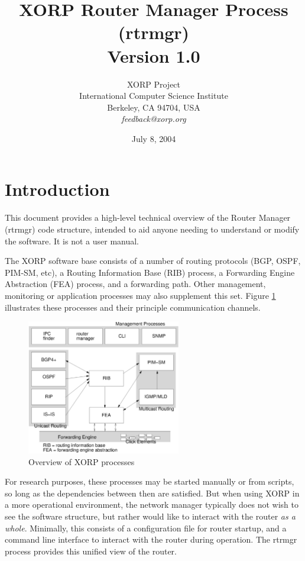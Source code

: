 \documentclass[11pt]{article}
\title{XORP Router Manager Process (rtrmgr) \\
\vspace{1ex}
Version 1.0}
\author{ XORP Project					\\
	 International Computer Science Institute	\\
	 Berkeley, CA 94704, USA			\\
	 {\it feedback@xorp.org}
}
\date{July 8, 2004}
\begin{document}
\maketitle

\section{Introduction}

This document provides a high-level technical overview of the Router
Manager (rtrmgr) code structure, intended to aid anyone needing to
understand or modify the software.   It is not a user manual.

The XORP software base consists of a number of routing protocols (BGP,
OSPF, PIM-SM, etc), a Routing Information Base (RIB) process, a
Forwarding Engine Abstraction (FEA) process, and a forwarding path.
Other management, monitoring or application processes may also
supplement this set.  Figure \ref{overview} illustrates these
processes and their principle communication channels.

\begin{figure}[htb]
\centerline{\includegraphics[width=0.6\textwidth]{figs/processes3}}
\vspace{.05in}
\caption{\label{overview}Overview of XORP processes}
\end{figure}

For research purposes, these processes may be started manually or from
scripts, so long as the dependencies between then are satisfied.  But
when using XORP in a more operational environment, the network manager
typically does not wish to see the software structure, but rather
would like to interact with the router {\it as a whole}.  Minimally, this
consists of a configuration file for router startup, and a command
line interface to interact with the router during operation.  The
rtrmgr process provides this unified view of the router.
\end{document}
